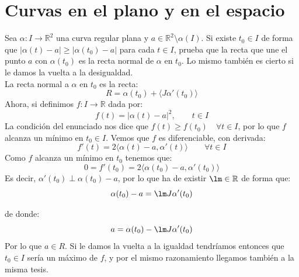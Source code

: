 \section{Curvas en el plano y en el espacio}
\begin{ejercicio}
    Sea $\alpha:I\to \mathbb{R}^2$ una curva regular plana y $a\in \mathbb{R}^2\setminus \alpha(I)$. Si existe $t_0\in I$ de forma que $|\alpha(t)-a|\geq |\alpha(t_0)-a|$ para cada $t\in I$, prueba que la recta que une el punto $a$ con $\alpha(t_0)$ es la recta normal de $\alpha$ en $t_0$. Lo mismo también es cierto si le damos la vuelta a la desigualdad.\\

    \noindent
    La recta normal a $\alpha$ en $t_0$ es la recta:
    \begin{equation*}
        R = \alpha(t_0) + \langle J\alpha'(t_0) \rangle 
    \end{equation*}
    Ahora, si definimos $f:I\to \mathbb{R}$ dada por:
    \begin{equation*}
        f(t) = |\alpha(t)-a|^2, \qquad t\in I
    \end{equation*}
    La condición del enunciado nos dice que $f(t)\geq f(t_0)\quad \forall t\in I$, por lo que $f$ alcanza un mínimo en $t_0\in I$. Vemos que $f$ es diferenciable, con derivada:
    \begin{equation*}
        f'(t) = 2\langle \alpha(t)-a,\alpha'(t) \rangle  \qquad \forall t\in I
    \end{equation*}
    Como $f$ alcanza un mínimo en $t_0$ tenemos que:
    \begin{equation*}
        0 = f'(t_0) = 2\langle \alpha(t_0)-a,\alpha'(t_0) \rangle 
    \end{equation*}
    Es decir, $\alpha'(t_0)\perp \alpha(t_0)-a$, por lo que ha de existir $\lm\in \mathbb{R}$ de forma que:
    \begin{equation*}
        \alpha(t_0) - a = \lm J\alpha'(t_0)
    \end{equation*}

    de donde:
    \begin{equation*}
        a = \alpha(t_0) - \lm J \alpha'(t_0)
    \end{equation*}
    Por lo que $a\in R$. Si le damos la vuelta a la igualdad tendríamos entonces que $t_0\in I$ sería un máximo de $f$, y por el mismo razonamiento llegamos también a la misma tesis.
\end{ejercicio}

